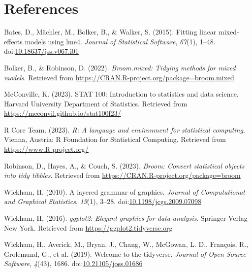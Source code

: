 \documentclass[10pt,a4paper,onecolumn]{article}
\newlength{\cslhangindent}
\newlength{\cslentryspacingunit} %
\newenvironment{CSLReferences}[2] %
 {%
  \setlength{\parindent}{0pt}
  \ifodd #1
  \let\oldpar\par
  \def\par{\hangindent=\cslhangindent\oldpar}
  \fi
  \setlength{\parskip}{#2\cslentryspacingunit}
 }%
 {}
\begin{document}
\hypertarget{references}{%
\section*{References}\label{references}}

\hypertarget{refs}{}
\begin{CSLReferences}{1}{0}
\leavevmode{}%
Bates, D., Mächler, M., Bolker, B., \& Walker, S. (2015). Fitting linear
mixed-effects models using {lme4}. \emph{Journal of Statistical
Software}, \emph{67}(1), 1--48.
doi:\href{https://doi.org/10.18637/jss.v067.i01}{10.18637/jss.v067.i01}

\leavevmode{}%
Bolker, B., \& Robinson, D. (2022). \emph{Broom.mixed: Tidying methods
for mixed models}. Retrieved from
\url{https://CRAN.R-project.org/package=broom.mixed}

\leavevmode{}%
McConville, K. (2023). STAT 100: Introduction to statistics and data
science. Harvard University Department of Statistics. Retrieved from
\url{https://mcconvil.github.io/stat100f23/}

\leavevmode{}%
R Core Team. (2023). \emph{R: A language and environment for statistical
computing}. Vienna, Austria: R Foundation for Statistical Computing.
Retrieved from \url{https://www.R-project.org/}

\leavevmode{}%
Robinson, D., Hayes, A., \& Couch, S. (2023). \emph{Broom: Convert
statistical objects into tidy tibbles}. Retrieved from
\url{https://CRAN.R-project.org/package=broom}

\leavevmode{}%
Wickham, H. (2010). A layered grammar of graphics. \emph{Journal of
Computational and Graphical Statistics}, \emph{19}(1), 3--28.
doi:\href{https://doi.org/10.1198/jcgs.2009.07098}{10.1198/jcgs.2009.07098}

\leavevmode{}%
Wickham, H. (2016). \emph{ggplot2: Elegant graphics for data analysis}.
Springer-Verlag New York. Retrieved from
\url{https://ggplot2.tidyverse.org}

\leavevmode{}%
Wickham, H., Averick, M., Bryan, J., Chang, W., McGowan, L. D.,
François, R., Grolemund, G., et al. (2019). Welcome to the {tidyverse}.
\emph{Journal of Open Source Software}, \emph{4}(43), 1686.
doi:\href{https://doi.org/10.21105/joss.01686}{10.21105/joss.01686}

\end{CSLReferences}
\end{document}
